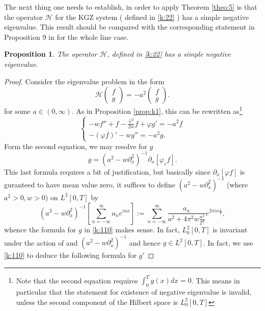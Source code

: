\documentclass[final,11pt,leqno]{amsart}
\newtheorem{proposition}{Proposition}
\begin{document}
The next thing one needs to establish, in order to apply Theorem \ref{theo:5} is that the operator ${\mathcal H}$ for the KGZ system ( defined in \eqref{k:22} )
has a simple negative eigenvalue. This result should be compared with the corresponding statement in Proposition 9 in  \cite{SS1} for the whole line case.
\begin{proposition}
\label{prop:k2}
The operator ${\mathcal H}$, defined in \eqref{k:22} has a simple negative eigenvalue.

\end{proposition}
\begin{proof}
Consider the eigenvalue problem in the form
$$
{\mathcal H}\left(\begin{array}{c} f \\ g \end{array}\right)=-a^2 \left(\begin{array}{c} f \\ g \end{array}\right).
$$
for some $a\in (0,\infty)$. As in Proposition \ref{prop:k1}, this can be rewritten as\footnote{Note that the second equation requires $\int_0^T g(x) dx=0$.
This means in particular  that the statement for existence of negative eigenvalue  is invalid, unless the second component of the Hilbert space is $L^2_0[0,T]$}
\begin{equation}
\label{k:100}
\left\{
\begin{array}{l}
-w f''+f-{\frac{{{\varphi}^2}}{{2w}}} f+{\varphi} g'=-a^2 f \\
-({\varphi} f)'-w g''=-a^2 g.
\end{array}\right.
\end{equation}
Form the second equation, we may resolve for $g$
\begin{equation}
\label{k:110}
g=  (a^2-w {\partial}_x^2)^{-1}{\partial}_x [{\varphi}_c f].
\end{equation}
This last formula requires a bit of justification, but basically since ${\partial}_x[{\varphi} f]$ is guranteed to have mean value zero, it suffices to define
$(a^2-w {\partial}_x^2)^{-1}$ (where $a^2>0, w>0$) on $L^2[0,T]$ by
$$
(a^2-w {\partial}_x^2)^{-1}[\sum_{n=-\infty}^\infty  a_n e^{i n x}]:=
\sum_{n=-\infty}^\infty
{\frac{{a_n}}{{a^2+4\pi^2 w {\frac{{n^2}}{{T^2}}}}}} e^{2\pi i n {\frac{{x}}{{T}}}},
$$
whence the formula for $g$ in \eqref{k:110} makes sense. In fact,  $L^2_0[0,T]$ is invariant under the action of  and $(a^2-w {\partial}_x^2)^{-1}$ and
hence $g\in L^2[0,T]$. In fact, we use \eqref{k:110} to deduce the following formula for $g'$

\end{proof}
\end{document}
